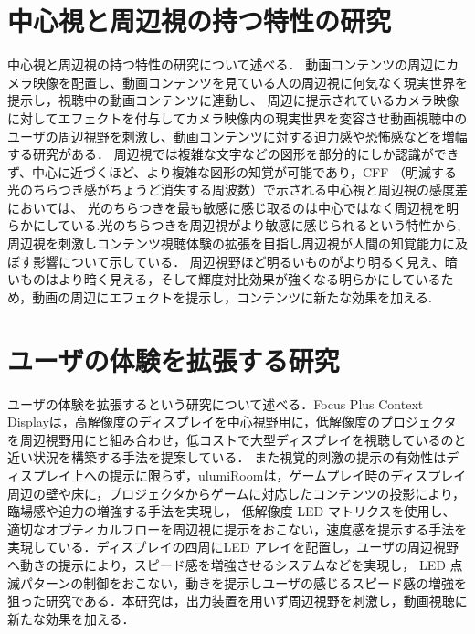 \section{中心視と周辺視の持つ特性の研究}
中心視と周辺視の持つ特性の研究について述べる．
動画コンテンツの周辺にカメラ映像を配置し、動画コンテンツを見ている人の周辺視に何気なく現実世界を提示し，視聴中の動画コンテンツに連動し、
周辺に提示されているカメラ映像に対してエフェクトを付与してカメラ映像内の現実世界を変容させ動画視聴中のユーザの周辺視野を刺激し、動画コンテンツに対する迫力感や恐怖感などを増幅する研究がある\cite{shamo4}．
周辺視では複雑な文字などの図形を部分的にしか認識ができず、中心に近づくほど、より複雑な図形の知覚が可能であり\cite{shamo5}，CFF （明滅する光のちらつき感がちょうど消失する周波数）で示される中心視と周辺視の感度差においては、
光のちらつきを最も敏感に感じ取るのは中心ではなく周辺視を明らかにしている\cite{shamo6}.光のちらつきを周辺視がより敏感に感じられるという特性から,周辺視を刺激しコンテンツ視聴体験の拡張を目指し周辺視が人間の知覚能力に及ぼす影響について示している\cite{shamo7}．
周辺視野ほど明るいものがより明るく見え、暗いものはより暗く見える，そして輝度対比効果が強くなる明らかにしているため\cite{shamo8}，動画の周辺にエフェクトを提示し，コンテンツに新たな効果を加える.

\section{ユーザの体験を拡張する研究}
ユーザの体験を拡張するという研究について述べる．Focus Plus Context Displayは，高解像度のディスプレイを中心視野用に，低解像度のプロジェクタを周辺視野用にと組み合わせ，低コストで大型ディスプレイを視聴しているのと近い状況を構築する手法を提案している\cite{shamo9}．
また視覚的刺激の提示の有効性はディスプレイ上への提示に限らず，ulumiRoomは，ゲームプレイ時のディスプレイ周辺の壁や床に，プロジェクタからゲームに対応したコンテンツの投影により，臨場感や迫力の増強する手法を実現し\cite{shamo10}，
低解像度 LED マトリクスを使用し、適切なオプティカルフローを周辺視に提示をおこない，速度感を提示する手法を実現している\cite{shamo11}．ディスプレイの四周にLED アレイを配置し，ユーザの周辺視野へ動きの提示により，スピード感を増強させるシステムなどを実現し，
LED 点滅パターンの制御をおこない，動きを提示しユーザの感じるスピード感の増強を狙った研究である\cite{shamo12}．本研究は，出力装置を用いず周辺視野を刺激し，動画視聴に新たな効果を加える．
